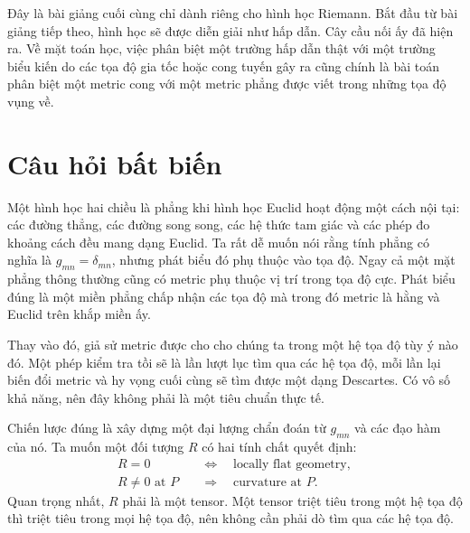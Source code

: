\begin{classroomqa}
\end{classroomqa}

Đây là bài giảng cuối cùng chỉ dành riêng cho hình học Riemann. Bắt đầu từ bài giảng tiếp theo, hình học sẽ được diễn giải như hấp dẫn. Cây cầu nối ấy đã hiện ra. Về mặt toán học, việc phân biệt một trường hấp dẫn thật với một trường biểu kiến do các tọa độ gia tốc hoặc cong tuyến gây ra cũng chính là bài toán phân biệt một metric cong với một metric phẳng được viết trong những tọa độ vụng về.

\section{Câu hỏi bất biến}

Một hình học hai chiều là phẳng khi hình học Euclid hoạt động một cách nội tại: các đường thẳng, các đường song song, các hệ thức tam giác và các phép đo khoảng cách đều mang dạng Euclid. Ta rất dễ muốn nói rằng tính phẳng có nghĩa là
\(g_{mn}=\delta_{mn}\), nhưng phát biểu đó phụ thuộc vào tọa độ. Ngay cả một mặt phẳng thông thường cũng có metric phụ thuộc vị trí trong tọa độ cực. Phát biểu đúng là một miền phẳng chấp nhận các tọa độ mà trong đó metric là hằng và Euclid trên khắp miền ấy.

Thay vào đó, giả sử metric được cho cho chúng ta trong một hệ tọa độ tùy ý nào đó. Một phép kiểm tra tồi sẽ là lần lượt lục tìm qua các hệ tọa độ, mỗi lần lại biến đổi metric và hy vọng cuối cùng sẽ tìm được một dạng Descartes. Có vô số khả năng, nên đây không phải là một tiêu chuẩn thực tế.

Chiến lược đúng là xây dựng một đại lượng chẩn đoán từ \(g_{mn}\) và các đạo hàm của nó. Ta muốn một đối tượng \(R\) có hai tính chất quyết định:
\[
\begin{aligned}
R=0
&\quad\Longleftrightarrow\quad
\text{locally flat geometry},\\
R\neq 0 \text{ at } P
&\quad\Longrightarrow\quad
\text{curvature at } P.
\end{aligned}
\]
Quan trọng nhất, \(R\) phải là một tensor. Một tensor triệt tiêu trong một hệ tọa độ thì triệt tiêu trong mọi hệ tọa độ, nên không cần phải dò tìm qua các hệ tọa độ.


